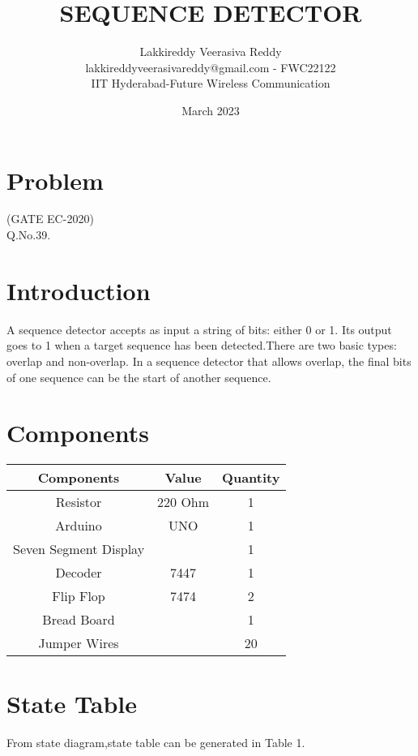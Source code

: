 \documentclass{article}
\title{SEQUENCE DETECTOR}
\date{March 2023}
\author{Lakkireddy Veerasiva Reddy\\lakkireddyveerasivareddy@gmail.com - FWC22122\\IIT Hyderabad-Future Wireless Communication}
\begin{document}
\maketitle
\tableofcontents
	\pagebreak
\section{Problem}
	(GATE EC-2020)\\
	Q.No.39. 
\section{Introduction}
  A sequence detector accepts as input a string of bits: either 0 or 1. Its output goes to 1 when a target sequence has been detected.There are two basic types:  overlap  and  non-overlap. In a sequence detector that allows overlap, the final bits of one sequence can be  the start of another sequence.
	\section{Components}	
\begin{table}[H]
\centering

\begin{tabular}{|c|c|c|}
\hline
Components & Value & Quantity\\
\hline
Resistor & 220 Ohm & 1\\
\hline
Arduino & UNO & 1\\
\hline
Seven Segment Display & & 1\\
\hline
Decoder & 7447 & 1\\
\hline
Flip Flop & 7474 & 2\\
\hline
Bread Board & & 1\\
\hline
Jumper Wires & & 20\\
\hline
\end{tabular}

\vspace{2mm}
\label{table:1}
\end{table}
\vspace{5mm}
\section{State Table}
  From state diagram,state table can be generated in Table 1.
  
\end{document}
